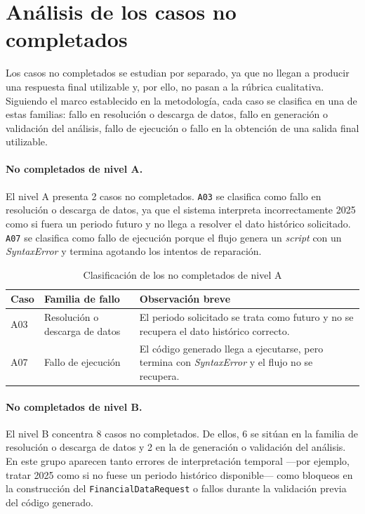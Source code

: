 \section{An\'alisis de los casos no completados}

Los casos no completados se estudian por separado, ya que no llegan a producir una respuesta final utilizable y, por ello, 
no pasan a la r\'ubrica cualitativa. Siguiendo el marco establecido en la metodolog\'ia, cada caso se clasifica en una de 
estas familias: fallo en resoluci\'on o descarga de datos, fallo en generaci\'on o validaci\'on del an\'alisis, fallo de 
ejecuci\'on o fallo en la obtenci\'on de una salida final utilizable.

\paragraph{No completados de nivel A.}
El nivel A presenta 2 casos no completados. \texttt{A03} se clasifica como fallo en resoluci\'on o descarga de datos, ya que 
el sistema interpreta incorrectamente 2025 como si fuera un periodo futuro y no llega a resolver el dato hist\'orico 
solicitado. \texttt{A07} se clasifica como fallo de ejecuci\'on porque el flujo genera un \textit{script} con un 
\textit{SyntaxError} y termina agotando los intentos de reparaci\'on.

\begin{table}[H]
\centering
\begin{tabularx}{\textwidth}{L{1.2cm}L{4.8cm}Y}
\toprule
Caso & Familia de fallo & Observaci\'on breve \\
\midrule
A03 & Resoluci\'on o descarga de datos & El periodo solicitado se trata como futuro y no se recupera el dato hist\'orico correcto. \\
A07 & Fallo de ejecuci\'on & El c\'odigo generado llega a ejecutarse, pero termina con \textit{SyntaxError} y el flujo no se recupera. \\
\bottomrule
\end{tabularx}
\caption{Clasificaci\'on de los no completados de nivel A}
\label{tab:no-completados-a}
\end{table}

\paragraph{No completados de nivel B.}
El nivel B concentra 8 casos no completados. De ellos, 6 se sit\'uan en la familia de resoluci\'on o descarga de datos y 2 
en la de generaci\'on o validaci\'on del an\'alisis. En este grupo aparecen tanto errores de interpretaci\'on temporal 
---por ejemplo, tratar 2025 como si no fuese un periodo hist\'orico disponible--- como bloqueos en la construcci\'on del 
\texttt{FinancialDataRequest} o fallos durante la validaci\'on previa del c\'odigo generado.

